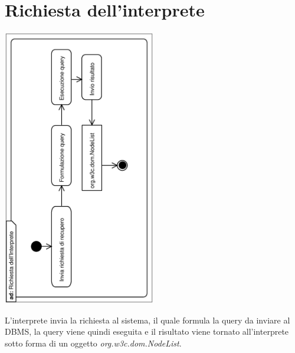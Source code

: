 \documentclass[11pt,titlepage,a4paper]{report}
\begin{document}
\section{Richiesta dell'interprete}
\begin{center}
 \includegraphics[width=0.5\textwidth, angle=-90]{RichiestadellInterprete.eps}
\end{center}
L'interprete invia la richiesta al sistema, il quale formula la query da inviare al DBMS, la query viene quindi eseguita e il risultato viene tornato all'interprete sotto forma di un oggetto  \textit{org.w3c.dom.NodeList}.
\end{document}
